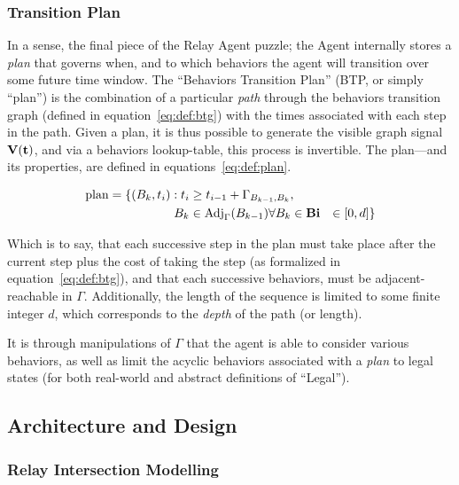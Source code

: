 \documentclass{report}
\begin{document}
\subsubsection{Transition Plan}
\label{sec:def:plan}

In a sense, the final piece of the Relay Agent puzzle; the Agent internally stores a \emph{plan} that governs when, and to which behaviors the agent will transition over some future time window.
The ``Behaviors Transition Plan'' (BTP, or simply ``plan'') is the combination of a particular \emph{path} through the behaviors transition graph (defined in equation~\eqref{eq:def:btg}) with the times associated with each step in the path.
Given a plan, it is thus possible to generate the visible graph signal $\bf{V}(t)$, and via a behaviors lookup-table, this process is invertible.
The plan---and its properties, are defined in equations~\eqref{eq:def:plan}.

\begin{align}\label{eq:def:plan}
	\mbox{plan} = \{(B_k, t_i) : t_{i} &\geq t_{i-1} + \Gamma_{B_{k-1},B_k},\\
	B_k &\in \mbox{Adj}_\Gamma(B_{k-1}) \forall B_k \in \bf{B}
		i &\in [0, d]
\}
\end{align}

Which is to say, that each successive step in the plan must take place after the current step plus the cost of taking the step (as formalized in equation~\eqref{eq:def:btg}), and that each successive behaviors, must be adjacent-reachable in $\Gamma$.
Additionally, the length of the sequence is limited to some finite integer $d$, which corresponds to the \emph{depth} of the path (or length).

It is through manipulations of $\Gamma$ that the agent is able to consider various behaviors, as well as limit the acyclic behaviors associated with a \emph{plan} to legal states (for both real-world and abstract definitions of ``Legal'').


\subsection{Architecture and Design}
\subsubsection{Relay Intersection Modelling}
\end{document}
